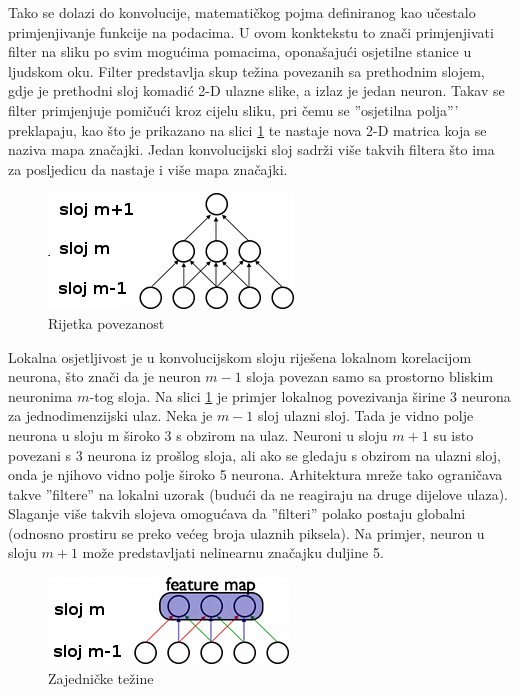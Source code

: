 \documentclass[times, utf8, diplomski, numeric]{fer}
\begin{document}
Tako se dolazi do konvolucije, matematičkog pojma definiranog kao učestalo primjenjivanje funkcije na podacima. U ovom konktekstu to znači primjenjivati filter na sliku po svim mogućima pomacima, oponašajući osjetilne stanice u ljudskom oku. Filter predstavlja skup težina povezanih sa prethodnim slojem, gdje je prethodni sloj komadić 2-D ulazne slike, a izlaz je jedan neuron. Takav se filter primjenjuje pomičući kroz cijelu sliku, pri čemu se ''osjetilna polja''' preklapaju, kao što je prikazano na slici \ref{fig:sparse-nn} te nastaje nova 2-D matrica koja se naziva mapa značajki. Jedan konvolucijski sloj sadrži više takvih filtera što ima za posljedicu da nastaje i više mapa značajki.

\begin{figure}[htb]
\centering
\includegraphics[scale=0.8]{imgs/sparse_1D_nn.png}
\caption{Rijetka povezanost}
\label{fig:sparse-nn}
\end{figure}

Lokalna osjetljivost je u konvolucijskom sloju riješena lokalnom korelacijom neurona, što znači da je neuron $m-1$ sloja povezan samo sa prostorno bliskim neuronima $m$-tog sloja. Na slici \ref{fig:sparse-nn} je primjer lokalnog povezivanja širine 3 neurona za jednodimenzijski ulaz.
Neka je $m-1$ sloj ulazni sloj. Tada je vidno polje neurona u sloju m široko 3 s obzirom na ulaz. Neuroni u sloju $m+1$ su isto povezani s 3 neurona iz prošlog sloja, ali ako se gledaju s obzirom na ulazni sloj, onda je njihovo vidno polje široko 5 neurona. Arhitektura mreže tako ograničava takve ''filtere'' na lokalni uzorak (budući da ne reagiraju na druge dijelove ulaza). Slaganje više takvih slojeva omogućava da ''filteri'' polako postaju globalni (odnosno prostiru se preko većeg broja ulaznih piksela). Na primjer, neuron u sloju $m+1$ može predstavljati  nelinearnu značajku duljine 5.

\begin{figure}[htb]
\centering
\includegraphics{imgs/conv_1D_nn.png}
\caption{Zajedničke težine}
\label{fig:conv-nn}
\end{figure}
\end{document}
